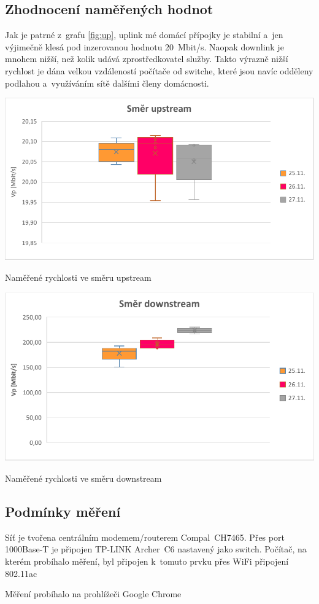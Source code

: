 \documentclass[a4paper,12pt]{article}   %
\begin{document}
\subsection*{Zhodnocení naměřených hodnot}
Jak je patrné z~grafu \ref{fig:up}, uplink mé domácí přípojky je stabilní a~jen výjimečně klesá pod inzerovanou hodnotu 20~Mbit/s. Naopak downlink je mnohem nižší, než kolik udává zprostředkovatel služby. Takto výrazně nižší rychlost je dána velkou vzdáleností počítače od switche, které jsou navíc odděleny podlahou a~využíváním sítě dalšími členy domácnosti.


\begin{graf}[hbtp]
  \centering
  \includegraphics[width = .6\textwidth]{tsi_uplink.pdf}
  \caption{Naměřené rychlosti ve směru upstream}
  \label{fig:up}
\end{graf}

\begin{graf}[hbtp]
  \centering
  \includegraphics[width = .6\textwidth]{tsi_downlink.pdf}
  \caption{Naměřené rychlosti ve směru downstream}
  \label{fig:down}
\end{graf}



\subsection*{Podmínky měření}
Síť je tvořena centrálním modemem/routerem Compal~CH7465. Přes port 1000Base-T je připojen TP-LINK Archer~C6 nastavený jako switch. Počítač, na kterém probíhalo měření, byl připojen k~tomuto prvku přes WiFi připojení 802.11ac

Měření probíhalo na prohlížeči Google Chrome
\end{document}
